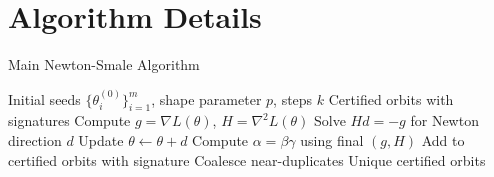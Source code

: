 \documentclass[11pt]{amsart}
\theoremstyle{plain}
\theoremstyle{definition}
\theoremstyle{remark}
\begin{document}
\appendix

\section{Algorithm Details}

\begin{algorithm}
\caption{Main Newton-Smale Algorithm}
\begin{algorithmic}
\REQUIRE Initial seeds $\{\theta^{(0)}_i\}_{i=1}^m$, shape parameter $p$, steps $k$
\ENSURE Certified orbits with signatures
        \STATE Compute $g = \nabla L(\theta)$, $H = \nabla^2 L(\theta)$
        \STATE Solve $Hd = -g$ for Newton direction $d$
        \STATE Update $\theta \leftarrow \theta + d$
    \ENDFOR
    \STATE Compute $\alpha = \beta \gamma$ using final $(g, H)$
        \STATE Add to certified orbits with signature
    \ENDIF
\ENDFOR
\STATE Coalesce near-duplicates
\RETURN Unique certified orbits
\end{algorithmic}
\end{algorithm}


\end{document}
